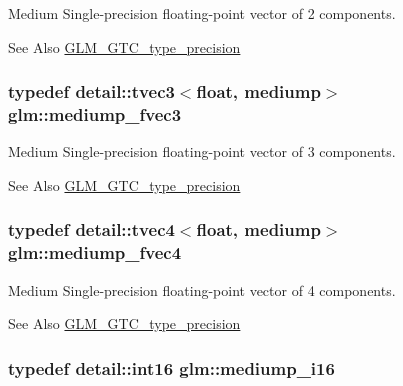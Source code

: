 Medium Single-\/precision floating-\/point vector of 2 components. \begin{DoxySeeAlso}{See Also}
\hyperlink{group__gtc__type__precision}{G\-L\-M\-\_\-\-G\-T\-C\-\_\-type\-\_\-precision} 
\end{DoxySeeAlso}
\hypertarget{group__gtc__type__precision_ga710c3af5ebb05e5e863cff78affd25a6}{
\subsubsection[{mediump\-\_\-fvec3}]{\setlength{\rightskip}{0pt plus 5cm}typedef detail\-::tvec3$<$float, mediump$>$ {\bf glm\-::mediump\-\_\-fvec3}}}\label{group__gtc__type__precision_ga710c3af5ebb05e5e863cff78affd25a6}
Medium Single-\/precision floating-\/point vector of 3 components. \begin{DoxySeeAlso}{See Also}
\hyperlink{group__gtc__type__precision}{G\-L\-M\-\_\-\-G\-T\-C\-\_\-type\-\_\-precision} 
\end{DoxySeeAlso}
\hypertarget{group__gtc__type__precision_gaba16de142de00531a1598d83716c6939}{
\subsubsection[{mediump\-\_\-fvec4}]{\setlength{\rightskip}{0pt plus 5cm}typedef detail\-::tvec4$<$float, mediump$>$ {\bf glm\-::mediump\-\_\-fvec4}}}\label{group__gtc__type__precision_gaba16de142de00531a1598d83716c6939}
Medium Single-\/precision floating-\/point vector of 4 components. \begin{DoxySeeAlso}{See Also}
\hyperlink{group__gtc__type__precision}{G\-L\-M\-\_\-\-G\-T\-C\-\_\-type\-\_\-precision} 
\end{DoxySeeAlso}
\hypertarget{group__gtc__type__precision_ga8454fc6a82c7bb787d0ac9663e08f63d}{
\subsubsection[{mediump\-\_\-i16}]{\setlength{\rightskip}{0pt plus 5cm}typedef detail\-::int16 {\bf glm\-::mediump\-\_\-i16}}}\label{group__gtc__type__precision_ga8454fc6a82c7bb787d0ac9663e08f63d}
